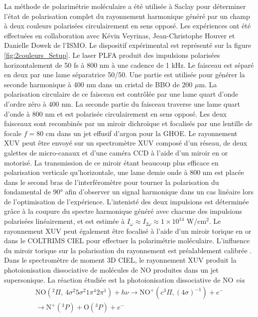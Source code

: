 La méthode de polarimétrie moléculaire a été utilisée à Saclay pour déterminer l'état de polarisation complet du rayonnement harmonique généré par un champ à deux couleurs polarisées circulairement en sens opposé. Les expériences ont été effectuées en collaboration avec Kévin Veyrinas, Jean-Christophe Houver et Danielle Dowek de l'ISMO. Le dispositif expérimental est représenté sur la figure \ref{fig:2couleurs_Setup}. Le laser PLFA  produit des impulsions polarisées horizontalement de 50 fs à 800 nm à une cadence de 1 kHz. Le faisceau est séparé en deux par une lame séparatrice 50/50. Une partie est utilisée pour générer la seconde harmonique à 400 nm dans un cristal de BBO de 200 $\mu$m. La polarisation circulaire de ce faisceau est contrôlée par une lame quart d'onde d'ordre zéro à 400 nm. La seconde partie du faisceau traverse une lame quart d'onde à 800 nm et est polarisée circulairement en sens opposé. Les deux faisceaux sont recombinés par un miroir dichroïque et focalisés par une lentille de focale $f = 80$ cm dans un jet effusif d'argon pour la GHOE. Le rayonnement XUV peut être envoyé sur un spectromètre XUV composé d'un réseau, de deux galettes de micro-canaux et d'une caméra CCD à l'aide d'un miroir en or motorisé. La transmission de ce miroir étant beaucoup plus efficace en polarisation verticale qu'horizontale, une lame demie onde à 800 nm est placée dans le second bras de l'interféromètre pour tourner la polarisation du fondamental de 90° afin d'observer un signal harmonique dans un cas linéaire lors de l'optimisation de l'expérience. L'intenisté des deux impulsions est déterminée grâce à la coupure du spectre harmonique généré avec chacune des impulsions polarisées linéairement, et est estimée à $I_\omega \approx I_{2\omega} \approx 1 \times 10^{14}$ W/cm$^2$. Le rayonnement XUV peut également être focalisé à l'aide d'un miroir torique en or dans le COLTRIMS CIEL  pour effectuer la polarimétrie moléculaire. L'influence du miroir torique sur la polarisation du rayonnement est préalablement calibrée . Dans le spectromètre de moment 3D CIEL, le rayonnement XUV produit la photoionisation dissociative de molécules de NO produites dans un jet supersonique. La réaction étudiée est la photoionisation dissociative de NO \textit{via}
\begin{multline}
\text{NO}(^2\Pi, \: 4\sigma^2 5\sigma^2 1\pi^4 2\pi^1) + h\nu \longrightarrow \text{NO}^+ (c ^3\Pi, (4\sigma)^{-1})  + e^- \\\longrightarrow \text{N}^+ (^3P) + \text{O} (^3P) + e^-
\label{eq:PID_NO}
\end{multline}

